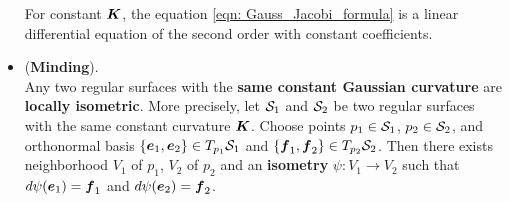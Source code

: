 \documentclass[11pt]{article}
\begin{document}
\begin{itemize}
For constant $\boldsymbol{K}$, the equation \eqref{eqn: Gauss_Jacobi_formula} is a linear differential equation of the second order with constant coefficients. 


\item \begin{theorem}\label{thm: minding_thm} (\textbf{Minding}). \citep{do1976differential} \\
Any two regular surfaces with the \textbf{same constant Gaussian curvature} are \textbf{locally isometric}. More precisely, let ${\mathcal S}_{1}$ and ${\mathcal S}_{2}$ be two regular surfaces with the same constant curvature $\boldsymbol{K}$. Choose points $p_{1}\in {\mathcal S}_{1}$, $p_{2}\in {\mathcal S}_{2}$, and orthonormal basis $\left\{\boldsymbol{e}_{1}, \boldsymbol{e}_{2}\right\}\in T_{p_{1}}{\mathcal S}_{1}$ and $\left\{\boldsymbol{f}_{1}, \boldsymbol{f}_{2}\right\}\in T_{p_{2}}{\mathcal S}_{2}$. Then there exists neighborhood $V_{1}$ of $p_{1}$, $V_{2}$ of $p_{2}$ and an \textbf{isometry} $\psi: V_{1}\rightarrow V_{2}$ such that $d\psi(\boldsymbol{e}_{1}) = \boldsymbol{f}_{1} $ and  $d\psi(\boldsymbol{e}_{2}) = \boldsymbol{f}_{2} $.
\end{theorem}


\end{itemize}
\end{document}
